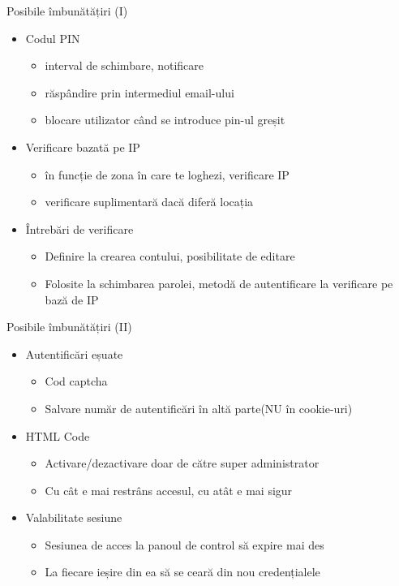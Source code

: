 \documentclass[9pt]{beamer}
\begin{document}
\begin{frame}{Posibile îmbunătățiri (I)}
\begin{itemize}
    \item \Large{Codul PIN}
    \begin{itemize}
		\vskip5pt
		\item interval de schimbare, notificare
		\vskip5pt
		\item răspândire prin intermediul email-ului
		\vskip5pt
		\item blocare utilizator când se introduce pin-ul greșit
	\end{itemize}
	\vskip10pt
	\item \Large{Verificare bazată pe IP}
    \begin{itemize}
		\vskip5pt
		\item în funcție de zona în care te loghezi, verificare IP
		\vskip5pt
		\item verificare suplimentară dacă diferă locația
	\end{itemize}
	\vskip10pt
	\item \Large{Întrebări de verificare}
    \begin{itemize}
		\vskip5pt
		\item Definire la crearea contului, posibilitate de editare
		\vskip5pt
		\item Folosite la schimbarea parolei, metodă de autentificare la verificare pe bază de IP
	\end{itemize}
\end{itemize}
\end{frame}

\begin{frame}{Posibile îmbunătățiri (II)}
\begin{itemize}
    \item \Large{Autentificări eșuate}
    \begin{itemize}
		\vskip5pt
		\item Cod captcha
		\vskip5pt
		\item Salvare număr de autentificări în altă parte(NU în cookie-uri)
	\end{itemize}
	\vskip10pt
	\item \Large{HTML Code}
    \begin{itemize}
		\vskip5pt
		\item Activare/dezactivare doar de către super administrator
		\vskip5pt
		\item Cu cât e mai restrâns accesul, cu atât e mai sigur
	\end{itemize}
	\vskip10pt
	\item \Large{Valabilitate sesiune}
    \begin{itemize}
		\vskip5pt
		\item Sesiunea de acces la panoul de control să expire mai des
		\vskip5pt
		\item La fiecare ieșire din ea să se ceară din nou credențialele
	\end{itemize}
\end{itemize}
\end{frame}
\end{document}
